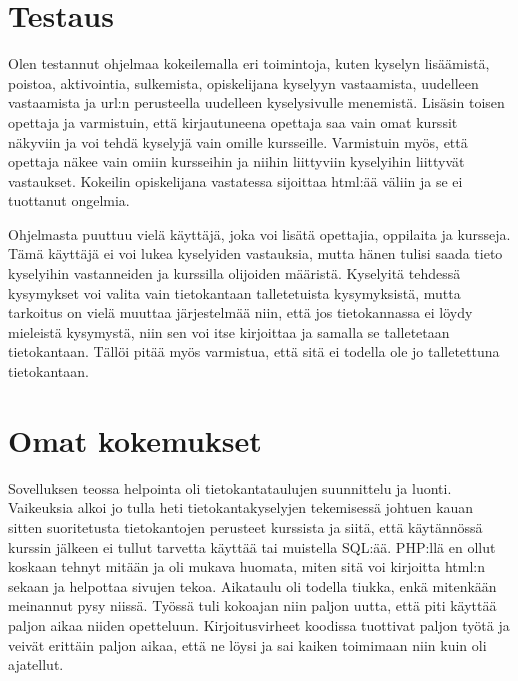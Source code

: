 \documentclass[12pt,twoside,a4paper,leqno,titlepage]{article}
\begin{document}
\section{Testaus}

Olen testannut ohjelmaa kokeilemalla eri toimintoja, kuten kyselyn lisäämistä,
poistoa, aktivointia, sulkemista, opiskelijana kyselyyn vastaamista, uudelleen
vastaamista ja url:n perusteella uudelleen kyselysivulle menemistä. Lisäsin
toisen opettaja ja varmistuin, että kirjautuneena opettaja saa vain omat kurssit
näkyviin ja voi tehdä kyselyjä vain omille kursseille. Varmistuin myös, että
opettaja näkee vain omiin kursseihin ja niihin liittyviin kyselyihin liittyvät
vastaukset. Kokeilin opiskelijana vastatessa sijoittaa html:ää väliin ja se ei
tuottanut ongelmia.

Ohjelmasta puuttuu vielä käyttäjä, joka voi lisätä opettajia, oppilaita ja kursseja.
Tämä käyttäjä ei voi lukea kyselyiden vastauksia, mutta hänen tulisi saada tieto
kyselyihin vastanneiden ja kurssilla olijoiden määristä. Kyselyitä tehdessä kysymykset
voi valita vain tietokantaan talletetuista kysymyksistä, mutta tarkoitus on vielä
muuttaa järjestelmää niin, että jos tietokannassa ei löydy mieleistä kysymystä, niin
sen voi itse kirjoittaa ja samalla se talletetaan tietokantaan. Tällöi pitää myös
varmistua, että sitä ei todella ole jo talletettuna tietokantaan.

\section{Omat kokemukset}

Sovelluksen teossa helpointa oli tietokantataulujen suunnittelu ja luonti. Vaikeuksia
alkoi jo tulla heti tietokantakyselyjen tekemisessä johtuen kauan sitten suoritetusta
tietokantojen perusteet kurssista ja siitä, että käytännössä kurssin jälkeen ei
tullut tarvetta käyttää tai muistella SQL:ää. PHP:llä en ollut koskaan tehnyt mitään
ja oli mukava huomata, miten sitä voi kirjoitta html:n sekaan ja helpottaa sivujen
tekoa. Aikataulu oli todella tiukka, enkä mitenkään meinannut pysy niissä. Työssä
tuli kokoajan niin paljon uutta, että piti käyttää paljon aikaa niiden
opetteluun. Kirjoitusvirheet koodissa tuottivat paljon työtä ja veivät 
erittäin paljon aikaa, että ne löysi ja sai kaiken toimimaan niin kuin oli ajatellut.
\end{document}
